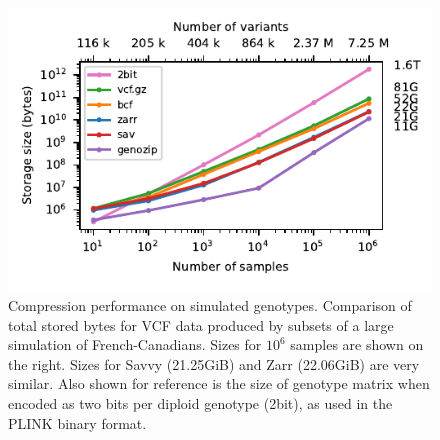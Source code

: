 \documentclass[a4paper,num-refs]{oup-contemporary}
\begin{document}
\begin{figure}
\begin{center}
\includegraphics[]{figures/data-scaling}
\end{center}
\caption{Compression performance on simulated genotypes.
Comparison of total stored bytes for VCF data produced 
by subsets of a large simulation of French-Canadians.
Sizes for $10^6$ samples are shown on the right. Sizes 
for Savvy (21.25GiB) and Zarr (22.06GiB) are very similar.
Also shown for reference is the size of genotype matrix 
when encoded as two bits per diploid genotype (2bit), as used 
in the PLINK binary format.
\label{fig-data-storage}}
\end{figure}
\end{document}
